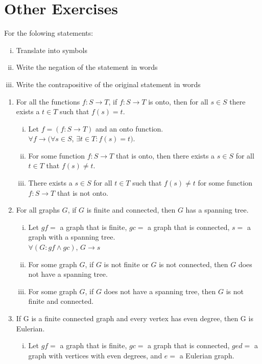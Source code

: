 \documentclass{article}
\begin{document}
\section*{Other Exercises} For the folowing statements:
\begin{enumerate}[i.]
\item Translate into symbols
\item Write the negation of the statement in words
\item Write the contrapositive of the original statement in words
\end{enumerate}
\begin{enumerate}
\item For all the functions $f:S\to T$, if $f:S\to T$ is onto, then for all $s\in S$ 
there exists a $t\in T$ such that $f(s)=t$.
	\begin{enumerate}[i.]
	\item Let $f=(f:S\to T) $ and an onto function.\\$\forall f\to(\forall s\in S$, $\exists t\in T:f(s)=t)$.
	\item For some function $f:S\to T$ that is onto, then there exists a $s\in S$ for all $t\in T$ that $f(s)\not=t$.
	\item There exists a $s\in S$ for all $t\in T$ such that $f(s)\not=t$ for some function $f:S\to T$ that is not onto.
	\end{enumerate}
\item For all graphs $G$, if $G$ is finite and connected, then $G$ has a spanning tree.
	\begin{enumerate}[i.]
	\item Let $gf=$ a graph that is finite, $gc=$ a graph that is connected, $s=$ a graph with a spanning tree.\\
	$\forall (G:gf\wedge gc)$, $G\to s$
	\item For some graph $G$, if $G$ is not finite or $G$ is not connected, then $G$ does not have a spanning tree.
	\item For some graph $G$, if $G$ does not have a spanning tree, then $G$ is not finite and connected.
	\end{enumerate}
\item If G is a finite connected graph and every vertex has even degree, then G is Eulerian.
	\begin{enumerate}[i.]
	\item Let $gf=$ a graph that is finite, $gc=$ a graph that is connected, $ged=$ a graph with vertices with even degrees, 
	and $e=$ a Eulerian graph.

\end{enumerate}
\end{enumerate}
\end{document}
